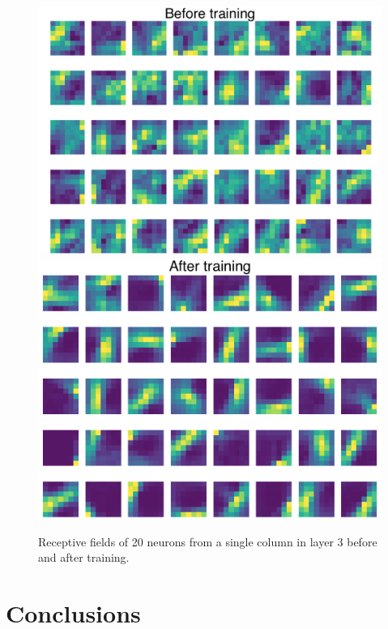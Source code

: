 \documentclass[12pt]{article}
\begin{document}
\begin{figure}[!htbp]
	\centering
	\includegraphics[width=12cm]{predictive_coding_stacked2_experiment3 before}
	\includegraphics[width=12cm]{predictive_coding_stacked2_experiment3 after}
	\caption{Receptive fields of 20 neurons from a single column in layer 3 before and after training.}
	\label{fig:experiment3}
\end{figure} 
 


\section{Conclusions}
\end{document}
